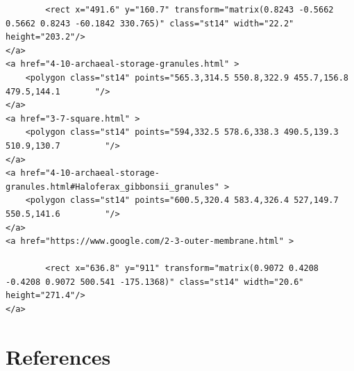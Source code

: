 \documentclass[]{tufte-book}
\begin{document}
\begin{verbatim}
        <rect x="491.6" y="160.7" transform="matrix(0.8243 -0.5662 0.5662 0.8243 -60.1842 330.765)" class="st14" width="22.2" height="203.2"/>
</a>
<a href="4-10-archaeal-storage-granules.html" >
    <polygon class="st14" points="565.3,314.5 550.8,322.9 455.7,156.8 479.5,144.1       "/>
</a>
<a href="3-7-square.html" >
    <polygon class="st14" points="594,332.5 578.6,338.3 490.5,139.3 510.9,130.7         "/>
</a>
<a href="4-10-archaeal-storage-granules.html#Haloferax_gibbonsii_granules" >
    <polygon class="st14" points="600.5,320.4 583.4,326.4 527,149.7 550.5,141.6         "/>
</a>
<a href="https://www.google.com/2-3-outer-membrane.html" >

        <rect x="636.8" y="911" transform="matrix(0.9072 0.4208 -0.4208 0.9072 500.541 -175.1368)" class="st14" width="20.6" height="271.4"/>
</a>
\end{verbatim}

\hypertarget{references}{%
\chapter{References}\label{references}}


\end{document}
